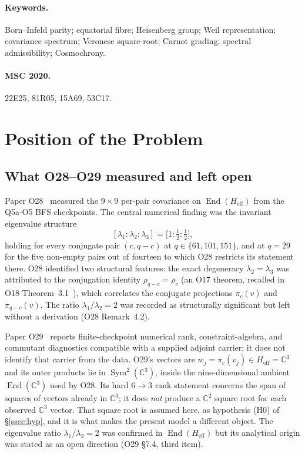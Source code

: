 \documentclass[11pt,a4paper]{article}
\DeclareMathOperator{\Sym}{Sym}
\DeclareMathOperator{\End}{End}
\newcommand{\Heff}{H_{\mathrm{eff}}}
\begin{document}
  \paragraph{Keywords.}
    Born--Infeld parity; equatorial fibre; Heisenberg group; Weil representation;
    covariance spectrum; Veronese square-root; Carnot grading; spectral admissibility; Cosmochrony.

  \paragraph{MSC 2020.}
    22E25, 81R05, 15A69, 53C17.

    \newpage
    \tableofcontents
    \newpage

  \section{Position of the Problem}
  \label{sec:position}

  \subsection{What O28--O29 measured and left open}

    Paper O28~\cite{Beau2026a32} measured the $9\times9$ per-pair covariance on $\End(\Heff)$
    from the Q5a-O5 BFS checkpoints.
    The central numerical finding was the invariant eigenvalue structure
    \begin{equation}
      \label{eq:empirical}
      [\lambda_1 : \lambda_2 : \lambda_3] = \bigl[1 : \tfrac{1}{2} : \tfrac{1}{2}\bigr],
    \end{equation}
    holding for every conjugate pair $(c, q-c)$ at $q \in \{61, 101, 151\}$, and at $q = 29$ for
    the five non-empty pairs out of fourteen to which O28 restricts its statement there.
    O28 identified two structural features: the exact degeneracy $\lambda_2 = \lambda_3$
    was attributed to the conjugation identity $\rho_{q-c} = \bar{\rho}_c$ (an O17 theorem,
    recalled in O18 Theorem~3.1~\cite{Beau2026a22}),
    which correlates the conjugate projections $\pi_c(v)$ and $\pi_{q-c}(v)$.
    The ratio $\lambda_1/\lambda_2 = 2$ was recorded as structurally significant but
    left without a derivation (O28 Remark~4.2).

    Paper O29~\cite{Beau2026a33} reports finite-checkpoint numerical rank, constraint-algebra, and
    commutant diagnostics compatible with a supplied adjoint carrier; it does not identify that
    carrier from the data.
    O29's vectors are $w_j = \pi_c(v_j) \in \Heff = \mathbb{C}^3$ and its outer products lie in
    $\Sym^2(\mathbb{C}^3)$, inside the nine-dimensional ambient $\End(\mathbb{C}^3)$ used by O28.
    Its hard $6 \to 3$ rank statement concerns the span of squares of vectors already in
    $\mathbb{C}^3$; it does \emph{not} produce a $\mathbb{C}^2$ square root for each observed
    $\mathbb{C}^3$ vector.
    That square root is assumed here, as hypothesis (H0) of \S\ref{ssec:hyp}, and it is what makes
    the present model a different object.
    The eigenvalue ratio $\lambda_1/\lambda_2 = 2$ was confirmed in $\End(\Heff)$ but its
    analytical origin was stated as an open direction (O29 \S7.4, third item).
\end{document}
